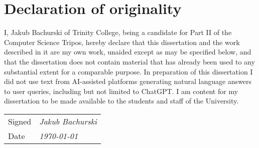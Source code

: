 \section*{Declaration of originality}

I, Jakub Bachurski of Trinity College, being a candidate for Part II of the Computer Science Tripos, hereby declare that this dissertation and the work described in it are my own work, unaided except as may be specified below, and that the dissertation does not contain material that has already been used to any substantial extent for a comparable purpose. In preparation of this dissertation I did not use text from AI-assisted platforms generating natural language answers to user queries, including but not limited to ChatGPT. I am content for my dissertation to be made available to the students and staff of the University.

\vspace{1cm}
\begin{tabular}{ll}
    Signed & \textit{Jakub Bachurski} \\
    Date & \textit{\today}
\end{tabular}

